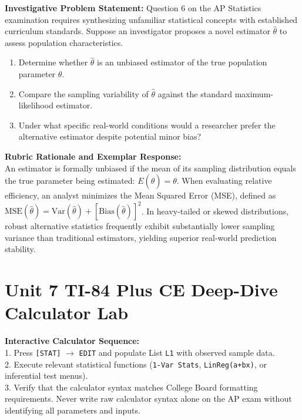 \begin{frqrubricbox}
\textbf{Investigative Problem Statement:} Question 6 on the AP Statistics examination requires synthesizing unfamiliar statistical concepts with established curriculum standards. Suppose an investigator proposes a novel estimator $\hat{\theta}$ to assess population characteristics.
\begin{enumerate}[label=(\alph*)]
  \item Determine whether $\hat{\theta}$ is an unbiased estimator of the true population parameter $\theta$.
  \item Compare the sampling variability of $\hat{\theta}$ against the standard maximum-likelihood estimator.
  \item Under what specific real-world conditions would a researcher prefer the alternative estimator despite potential minor bias?
\end{enumerate}
\textbf{Rubric Rationale and Exemplar Response:}\\
An estimator is formally unbiased if the mean of its sampling distribution equals the true parameter being estimated: $E(\hat{\theta}) = \theta$. When evaluating relative efficiency, an analyst minimizes the Mean Squared Error (MSE), defined as $\text{MSE}(\hat{\theta}) = \text{Var}(\hat{\theta}) + [\text{Bias}(\hat{\theta})]^2$. In heavy-tailed or skewed distributions, robust alternative statistics frequently exhibit substantially lower sampling variance than traditional estimators, yielding superior real-world prediction stability.
\end{frqrubricbox}\vspace{6pt}
\section{Unit 7 TI-84 Plus CE Deep-Dive Calculator Lab}
\begin{calculatorbox}
\textbf{Interactive Calculator Sequence:}\\
1. Press \texttt{[STAT]} $\rightarrow$ \texttt{EDIT} and populate List \texttt{L1} with observed sample data.\\
2. Execute relevant statistical functions (\texttt{1-Var Stats}, \texttt{LinReg(a+bx)}, or inferential test menus).\\
3. Verify that the calculator syntax matches College Board formatting requirements. Never write raw calculator syntax alone on the AP exam without identifying all parameters and inputs.
\end{calculatorbox}\vspace{10pt}
